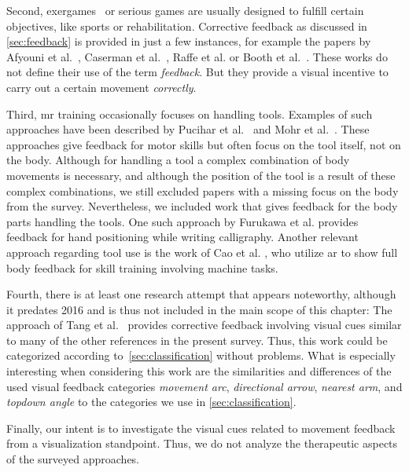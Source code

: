 Second, exergames~\cite{oh2010defining} or serious games are usually designed to fulfill certain objectives, like sports or rehabilitation. Corrective feedback as discussed in \autoref{sec:feedback} is provided in just a few instances, for example the papers by Afyouni et al.~\cite{afyouni2020arb}, Caserman et al.~\cite{caserman2021fbm}, Raffe et al. \cite{raffe2018cst} or Booth et al.~\cite{booth2019vue}. These works do not define their use of the term \emph{feedback}. But they provide a visual incentive to carry out a certain movement \emph{correctly}.

Third, \acrshort{mr} training occasionally focuses on handling tools. Examples of such approaches have been described by Pucihar et al.~\cite{pucihar2015dcm} and Mohr et al.~\cite{mohr2017rvt}. These approaches give feedback for motor skills but often focus on the tool itself, not on the body. Although for handling a tool a complex combination of body movements is necessary, and although the position of the tool is a result of these complex combinations, we still excluded papers with a missing focus on the body from the survey. Nevertheless, we included work that gives feedback for the body parts handling the tools. One such approach by Furukawa et al.\cite{furukawa2018dar} provides feedback for hand positioning while writing calligraphy. Another relevant approach regarding tool use is the work of Cao et al. \cite{cao2020esa}, who utilize \acrshort{ar} to show full body feedback for skill training involving machine tasks.

Fourth, there is at least one research attempt that appears noteworthy, although it predates 2016 and is thus not included in the main scope of this chapter: The approach of Tang et al.~\cite{tang2015pah} provides corrective feedback involving visual cues similar to many of the other references in the present survey. Thus, this work could be categorized according to~\autoref{sec:classification} without problems. What is especially interesting when considering this work are the similarities and differences of the used visual feedback categories \emph{movement arc}, \emph{directional arrow}, \emph{nearest arm}, and \emph{topdown angle} to the categories we use in \autoref{sec:classification}.


Finally, our intent is to investigate the visual cues related to movement feedback from a visualization standpoint. Thus, we do not analyze the therapeutic aspects of the surveyed approaches.

